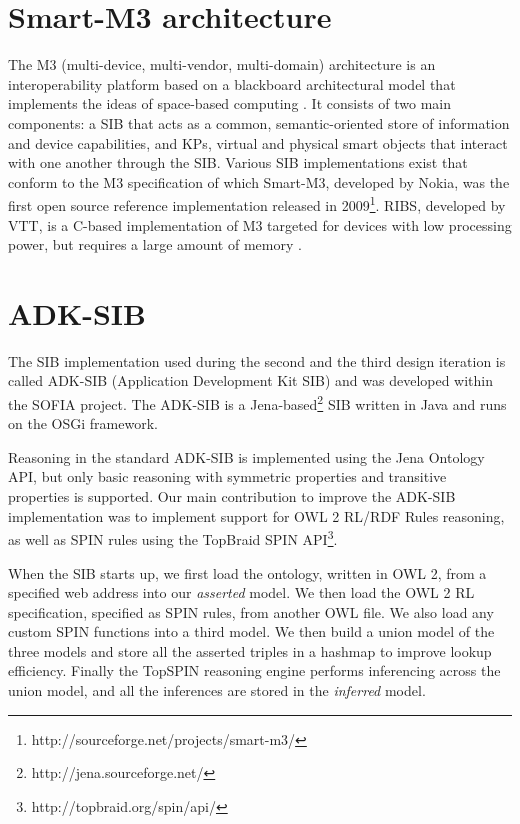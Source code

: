 \section{Smart-M3 architecture}
\label{m3}
The M3 (multi-device, multi-vendor, multi-domain) architecture is an interoperability platform based on a blackboard architectural model that implements the ideas of space-based computing \cite{Honkola2010}. It consists of two main components: a \ac{SIB} that acts as a common, semantic-oriented store of information and device capabilities, and \acp{KP}, virtual and physical smart objects that interact with one another through the \ac{SIB}. Various \ac{SIB} implementations exist that conform to the M3 specification of which Smart-M3, developed by Nokia, was the first open source reference implementation released in 2009\footnote{http://sourceforge.net/projects/smart-m3/}. \ac{RIBS}, developed by VTT, is a C-based implementation of M3 targeted for devices with low processing power, but requires a large amount of memory \cite{Etelapera2011}.  


\section{ADK-SIB}

The \ac{SIB} implementation used during the second and the third design iteration is called ADK-SIB (Application Development Kit SIB) and was developed within the \ac{SOFIA} project. The ADK-SIB is a Jena-based\footnote{http://jena.sourceforge.net/} \ac{SIB} written in Java and runs on the \ac{OSGi} framework.

Reasoning in the standard ADK-SIB is implemented using the Jena Ontology API, but only basic reasoning with symmetric properties and transitive properties is supported. Our main contribution to improve the ADK-SIB implementation was to implement support for OWL 2 RL/RDF Rules reasoning, as well as \ac{SPIN} rules using the TopBraid \ac{SPIN} API\footnote{http://topbraid.org/spin/api/}.

When the \ac{SIB} starts up, we first load the ontology, written in \ac{OWL} 2, from a specified web address into our \emph{asserted} model. We then load the OWL 2 RL specification, specified as \ac{SPIN} rules, from another \ac{OWL} file. We also load any custom \ac{SPIN} functions into a third model. We then build a union model of the three models and store all the asserted triples in a hashmap to improve lookup efficiency. Finally the TopSPIN reasoning engine performs inferencing across the union model, and all the inferences are stored in the \emph{inferred} model.

